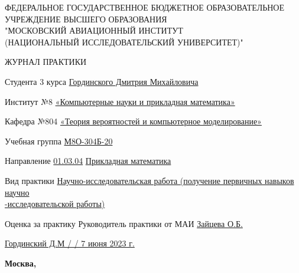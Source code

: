 \begin{titlepage}
\begin{center}
\bfseries

{\Large ФЕДЕРАЛЬНОЕ ГОСУДАРСТВЕННОЕ БЮДЖЕТНОЕ ОБРАЗОВАТЕЛЬНОЕ\\ УЧРЕЖДЕНИЕ ВЫСШЕГО ОБРАЗОВАНИЯ\\ "МОСКОВСКИЙ АВИАЦИОННЫЙ ИНСТИТУТ\\ (НАЦИОНАЛЬНЫЙ ИССЛЕДОВАТЕЛЬСКИЙ УНИВЕРСИТЕТ)"

}

\vspace{56pt}

{\large ЖУРНАЛ ПРАКТИКИ 

}

\end{center}

\vspace{36pt}

Студента 3 курса \hspace{3cm}        \underline{Гординского Дмитрия Михайловича}

\vspace{26pt}

Институт №8 \underline{«Компьютерные науки и прикладная математика»}

\vspace{26pt}

Кафедра №804 \underline{«Теория вероятностей и компьютерное моделирование»}

\vspace{26pt}

Учебная группа \underline{М8О-304Б-20}

\vspace{26pt}

Направление \underline{01.03.04} \hspace{3cm} \underline{Прикладная математика}

\vspace{26pt}

Вид практики \underline{Научно-исследовательская работа (получение первичных навыков научно \\
-исследовательской работы)}

\vspace{26pt}

Оценка за практику \underline{ \hspace{3cm}} Руководитель практики от МАИ \underline{Зайцева О.Б.}

\vspace{46pt}

\underline{Гординский Д.М / \hspace{3cm} / 7 июня 2023 г.}

\vfill

\begin{center}
\bfseries
Москва, \the\year
\end{center}
\end{titlepage}

\pagebreak
